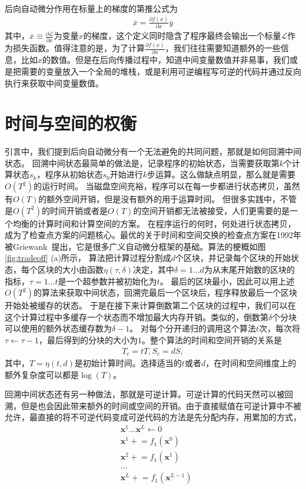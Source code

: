 \documentclass[A4,twoside,fontset=ubuntu,UTF8]{ctexart}
\newcommand{\vx}{{\mathbf{x}}}
\begin{document}
后向自动微分作用在标量上的梯度的第推公式为
\begin{align}
    \overline{x} = \frac{\partial f(x)}{\partial x}\overline{y}
\end{align}
其中，$\overline{x}\equiv \frac{\partial \mathcal{L}}{\partial x}$为变量$x$的梯度，这个定义同时隐含了程序最终会输出一个标量$\mathcal{L}$作为损失函数。值得注意的是，为了计算$\frac{\partial f(x)}{\partial x}$，我们往往需要知道额外的一些信息，比如$x$的数值。但是在后向传播过程中，知道中间变量数值并非易事，我们或是把需要的变量放入一个全局的堆栈，或是利用可逆编程写可逆的代码并通过反向执行来获取中间变量数值。


\section{时间与空间的权衡}\label{sec:timespace}

引言中，我们提到后向自动微分有一个无法避免的共同问题，那就是如何回溯中间状态。
回溯中间状态最简单的做法是，记录程序的初始状态，当需要获取第$k$个计算状态$s_k$，程序从初始状态$s_0$开始进行$k$步运算。这么做缺点明显，那么就是需要$O(T^2)$的运行时间。
当磁盘空间充裕，程序可以在每一步都进行状态拷贝，虽然有$O(T)$的额外空间开销，但是没有额外的用于运算时间。
但很多实践中，不管是$O(T^2)$的时间开销或者是$O(T)$的空间开销都无法被接受，人们更需要的是一个均衡的计算时间和计算空间的方案。
    在程序运行的何时，何处进行状态拷贝，成为了检查点方案的问题核心。最优的关于时间和空间交换的检查点方案在1992年被Griewank~\cite{Griewank1992}提出，它是很多广义自动微分框架的基础。算法的梗概如图\ref{fig:tradeoff} (a)所示，
    算法把计算过程分割成$d$个区块，并记录每个区块的开始状态，每个区块的大小由函数$\eta(\tau, \delta)$决定，其中$\delta=1\ldots d$为从末尾开始数的区块的指标，$\tau = 1\ldots t$是一个超参数并被初始化为$t$。
最后的区块最小，因此可以用上述$O(T^2)$的算法来获取中间状态，回溯完最后一个区块后，程序释放最后一个区块开始处被缓存的状态。
于是在接下来计算倒数第二个区块的过程中，我们可以在这个计算过程中多缓存一个状态而不增加最大内存开销。类似的，倒数第$\delta$个分块可以使用的额外状态缓存数为$\delta-1$。
对每个分开递归的调用这个算法$t$次，每次将$\tau\leftarrow \tau-1$，最后得到的分块的大小为$1$。整个算法的时间和空间开销的关系是
\begin{align}
    T_c = tT, S_c = dS,
\end{align}
其中，$T = \eta(t, d)$是初始计算时间。选择适当的$t$或者$d$，在时间和空间维度上的额外复杂度可以都是$\log(T)$。

回溯中间状态还有另一种做法，那就是可逆计算。可逆计算的代码天然可以被回溯，但是也会因此带来额外的时间或空间的开销。由于直接赋值在可逆计算中不被允许，最直接的将不可逆代码变成可逆代码的方法是先分配内存，用累加的方式，
\begin{align}
    &\vx^1 \ldots \vx^L \leftarrow 0\\
    &\vx^1 \mathrel{+}= f_1(\vx^0)\\
    &\vx^2 \mathrel{+}= f_1(\vx^1)\\
    &\ldots\\
    &\vx^L \mathrel{+}= f_1(\vx^{L-1})
\end{align}
\end{document}
